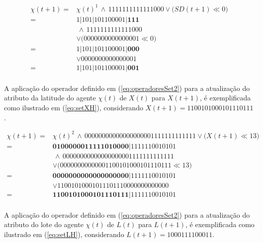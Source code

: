 \begin{equation}
 \begin{split}
 \chi(t + 1)   = & \chi(t)^1 \, \wedge \, 1111111111111000 \vee \big(SD(t + 1) \ll 0\big) \\
	       = & 1 | 1 0 1 | 1 0 1 1 0 0 0 0 1 | \boldsymbol{1 1 1} \\
	         & \, \wedge \, 1111111111111000 \\
	         & \vee \big(0000000000000001 \ll 0\big) \\
	       = & 1 | 1 0 1 | 1 0 1 1 0 0 0 0 1 | \boldsymbol{0 0 0} \\
	         & \vee 0000000000000001 \\
	       = & 1 | 1 0 1 | 1 0 1 1 0 0 0 0 1 | \boldsymbol{0 0 1} \\
 \label{eq:setSDH}
 \end{split}
\end{equation}

A aplicação do operador definido em (\ref{eq:operadoresSet2}) para a atualização do atributo da latitude do agente $\chi(t)$ de $X(t)$ para $X(t + 1)$, é exemplificada como ilustrado em (\ref{eq:setXH}), considerando $X(t + 1) = 1 1 0 0 1 0 1 0 0 0 1 0 1 1 1 0 1 1 1$.

\begin{equation}
 \begin{split}
 \chi(t + 1)   = & \chi(t)^2 \, \wedge \, 00000000000000000001111111111111 \vee \big(X(t + 1) \ll 13\big) \\
	       = & \boldsymbol{0 1 0 0 0 0 0 0 1 1 1 1 1 0 1 0 0 0 0} | 1 1 1 1 1 1 0 0 1 0 1 0 1 \\
	         & \, \wedge \, 00000000000000000001111111111111 \\
	         & \vee \big(00000000000001100101000101110111 \ll 13\big) \\
	       = & \boldsymbol{0 0 0 0 0 0 0 0 0 0 0 0 0 0 0 0 0 0 0} | 1 1 1 1 1 1 0 0 1 0 1 0 1 \\
	         & \vee 11001010001011101110000000000000 \\
	       = & \boldsymbol{1 1 0 0 1 0 1 0 0 0 1 0 1 1 1 0 1 1 1} | 1 1 1 1 1 1 0 0 1 0 1 0 1 \\
 \label{eq:setXH}
 \end{split}
\end{equation}

A aplicação do operador definido em (\ref{eq:operadoresSet2}) para a atualização do atributo do lote do agente $\chi(t)$ de $L(t)$ para $L(t + 1)$, é exemplificada como ilustrado em (\ref{eq:setLH}), considerando $L(t + 1) = 1 0 0 0 1 1 1 1 0 0 0 1 1$.

